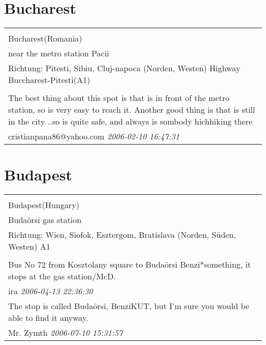 \documentclass[a4paper,12pt]{article}
\begin{document}
\section{Bucharest}
\begin{tabular}{|p{13cm}|}
\hline\\
Bucharest(Romania)\\
near the metro station Pacii\\
Richtung: Pitesti, Sibiu, Cluj-napoca (Norden, Westen) Highway Buccharest-Pitesti(A1) \\
\hline\\
The best thing about this spot is that is in front of the metro station, so is very easy to reach it. Another good thing is that is still in the city ..so is quite safe, and always is sombody hichhiking there \\
cristianpana86@yahoo.com \textit{ 2006-02-10 16:47:31 }\\\hline
\end{tabular}


\section{Budapest}
\begin{tabular}{|p{13cm}|}
\hline\\
Budapest(Hungary)\\
Budaörsi gas station\\
Richtung: Wien, Siofok, Esztergom, Bratislava (Norden, Süden, Westen) A1 \\
\hline\\
Bus No 72 from Kosztolany square to Budaörsi Benzi*something, it stops at the gas station/McD. \\
ira \textit{ 2006-04-13 22:36:30 }\\\hline The stop is called Budaörsi, BenziKUT, but I'm sure you would be able to find it anyway. \\
Mr. Zymth \textit{ 2006-07-10 15:31:57 }\\\hline
\end{tabular}
\end{document}
